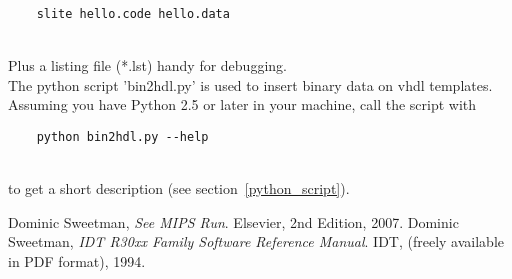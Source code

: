 \documentclass[11pt]{article}
\begin{document}
    \begin{verbatim}
    slite hello.code hello.data
    \end{verbatim}\\

    Plus a listing file (*.lst) handy for debugging.\\


    The python script 'bin2hdl.py' is used to insert binary data on vhdl templates.
    Assuming you have Python 2.5 or later in your machine, call the script with

    \begin{verbatim}
    python bin2hdl.py --help
    \end{verbatim}\\

    to get a short description (see section~\ref{python_script}).
    
    \begin{thebibliography}{9}

      Dominic Sweetman,
      \emph{See MIPS Run}.
      Elsevier,
      2nd Edition,
      2007.
      Dominic Sweetman,
      \emph{IDT R30xx Family Software Reference Manual}.
      IDT,
      (freely available in PDF format),
      1994.

    \end{thebibliography}
\end{document}
